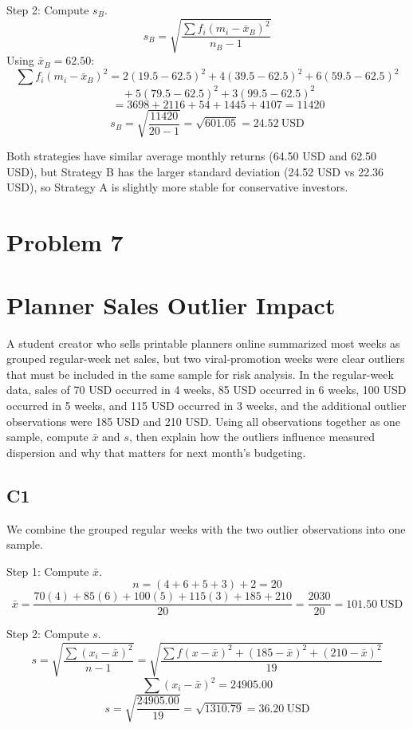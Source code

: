 \begin{ExamProblems}
		Step 2: Compute $s_B$.
		\[
		s_B = \sqrt{\frac{\sum f_i(m_i-\bar{x}_B)^2}{n_B-1}}
		\]
		Using $\bar{x}_B=62.50$:
		\[
		\sum f_i(m_i-\bar{x}_B)^2 = 2(19.5-62.5)^2 + 4(39.5-62.5)^2 + 6(59.5-62.5)^2
		\]
		\[
		\qquad + 5(79.5-62.5)^2 + 3(99.5-62.5)^2
		\]
		\[
		\qquad = 3698 + 2116 + 54 + 1445 + 4107 = 11420
		\]
		\[
		s_B = \sqrt{\frac{11420}{20-1}} = \sqrt{601.05} = 24.52\ \text{USD}
		\]

		Both strategies have similar average monthly returns (64.50 USD and 62.50 USD), but Strategy B has the larger standard deviation (24.52 USD vs 22.36 USD), so Strategy A is slightly more stable for conservative investors.

		\newpage
		\item
		\section{Problem 7}
		\section{Planner Sales Outlier Impact}
		A student creator who sells printable planners online summarized most weeks as grouped regular-week net sales, but two viral-promotion weeks were clear outliers that must be included in the same sample for risk analysis. In the regular-week data, sales of 70 USD occurred in 4 weeks, 85 USD occurred in 6 weeks, 100 USD occurred in 5 weeks, and 115 USD occurred in 3 weeks, and the additional outlier observations were 185 USD and 210 USD. Using all observations together as one sample, compute $\bar{x}$ and $s$, then explain how the outliers influence measured dispersion and why that matters for next month's budgeting.

		\subsection*{C1}
		We combine the grouped regular weeks with the two outlier observations into one sample.

		Step 1: Compute $\bar{x}$.
		\[
		n = (4+6+5+3)+2 = 20
		\]
		\[
		\bar{x} = \frac{70(4)+85(6)+100(5)+115(3)+185+210}{20}
		= \frac{2030}{20}
		= 101.50\ \text{USD}
		\]

		Step 2: Compute $s$.
		\[
		s = \sqrt{\frac{\sum (x_i-\bar{x})^2}{n-1}}
		= \sqrt{\frac{\sum f(x-\bar{x})^2 + (185-\bar{x})^2 + (210-\bar{x})^2}{19}}
		\]
		\[
		\sum (x_i-\bar{x})^2 = 24905.00
		\]
		\[
		s = \sqrt{\frac{24905.00}{19}} = \sqrt{1310.79} = 36.20\ \text{USD}
		\]


\end{ExamProblems}
